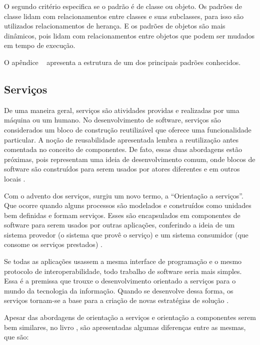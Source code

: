 O segundo critério especifica se o padrão é de classe ou objeto. Os padrões de classe lidam com relacionamentos entre classes e suas subclasses, para isso são utilizados relacionamentos de herança. E os padrões de objetos são mais dinâmicos, pois lidam com relacionamentos entre objetos que podem ser mudados em tempo de execução.

O apêndice ~ apresenta a estrutura de um dos principais padrões conhecidos.

\subsection{Serviços}

De uma maneira geral, serviços são atividades providas e realizadas por uma máquina ou um humano. No desenvolvimento de software, serviços são considerados um bloco de construção reutilizável que oferece uma funcionalidade particular. A noção de reusabilidade apresentada lembra a reutilização antes comentada no conceito de componentes. De fato, essas duas abordagens estão próximas, pois representam uma ideia de desenvolvimento comum, onde blocos de software são construídos para serem usados por atores diferentes e em outros locais \cite{Stojanovic:Dahanayake:2005}.

Com o advento dos serviços, surgiu um novo termo, a ``Orientação a serviços''. Que ocorre quando alguns processos são modelados e construídos como unidades bem definidas e formam serviços. Esses são encapsulados em componentes de software para serem usados por outras aplicações, conferindo a ideia de um sistema provedor (o sistema que provê o serviço) e um sistema consumidor (que consome os serviços prestados) \cite{Victorino:Brascher:2009}.

Se todas as aplicações usassem a mesma interface de programação e o mesmo protocolo de interoperabilidade, todo trabalho de software seria mais simples. Essa é a premissa que trouxe o desenvolvimento orientado a serviços para o mundo da tecnologia da informação. Quando se desenvolve dessa forma, os serviços tornam-se a base para a criação de novas estratégias de solução \cite{Newcomer:Lomow:2004}.

Apesar das abordagens de orientação a serviços e orientação a componentes serem bem similares, no livro \cite{Stojanovic:Dahanayake:2005}, são apresentadas algumas diferenças entre as mesmas, que são:

